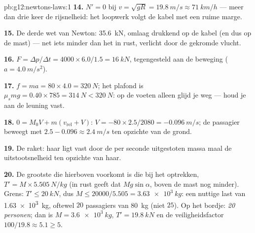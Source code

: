 \begin{solution}{pb:g12:newtons-laws:1}
\textbf{14.} $N' = 0$ bij $v = \sqrt{gR} = \qty{19.8}{m/s} \approx
\qty{71}{km/h}$ --- meer dan drie keer de rijsnelheid: het loopwerk
volgt de kabel met een ruime marge.

\textbf{15.} De derde wet van Newton: \qty{35.6}{kN}, omlaag drukkend op
de kabel (en dus op de mast) --- net iets minder dan het  in rust,
verlicht door de gekromde vlucht.

\textbf{16.} $F = \Delta p/\Delta t = 4000 \times 6.0/1.5 = \qty{16}{kN}$,
tegengesteld aan de beweging ($a = \qty{4.0}{m/s^2}$).

\textbf{17.} $f = ma = 80 \times 4.0 = \qty{320}{N}$; het plafond is
$\mu_s mg = 0.40 \times 785 = \qty{314}{N} < \qty{320}{N}$: op de voeten
alleen glijd je weg --- houd je aan de leuning vast.

\textbf{18.} $0 = M_0 V + m(v_{\text{rel}} + V)$:
$V = -80 \times 2.5/2080 = \qty{-0.096}{m/s}$; de passagier beweegt met
$2.5 - 0.096 \approx \qty{2.4}{m/s}$ ten opzichte van de grond.

\textbf{19.} De raket: haar  ligt vast door de per seconde
uitgestoten massa maal de uitstootsnelheid ten opzichte van haar.

\textbf{20.} De grootste  die hierboven voorkomt is die bij het
optrekken, $T' = M \times \qty{5.505}{N/kg}$ (in rust geeft dat
$Mg\sin\alpha$, boven de mast nog minder). Grens:
$T' \leq \qty{20}{kN}$, dus $M \leq 20000/5.505 = \qty{3.63e3}{kg}$: een
nuttige last van \qty{1.63e3}{kg}, oftewel $20$ passagiers van
\qty{80}{kg} (niet $25$). Op het bordje: \emph{20 personen}; dan is
$M = \qty{3.6e3}{kg}$, $T' = \qty{19.8}{kN}$ en de veiligheidsfactor
$100/19.8 \approx 5.1 \geq 5$.
\end{solution}
